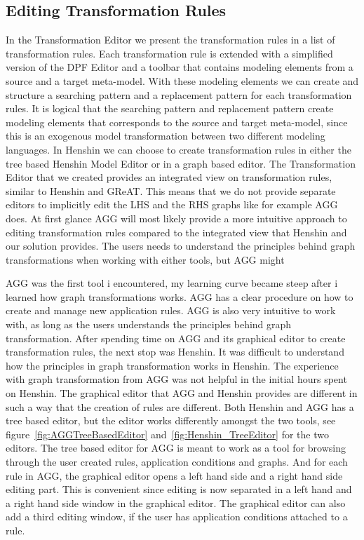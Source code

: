 \subsection{Editing Transformation Rules}

In the Transformation Editor we present the transformation rules in a list of
transformation rules. Each transformation rule is extended with a simplified
version of the DPF Editor and a toolbar that contains modeling elements from a
source and a target meta-model. With these modeling elements we can create and
structure a searching pattern and a replacement pattern for each transformation
rules. It is logical that the searching pattern and replacement pattern create
modeling elements that corresponds to the source and target meta-model, since
this is an exogenous model transformation between two different modeling
languages. In Henshin we can choose to create transformation rules in either the
tree based Henshin Model Editor or in a graph based editor. The Transformation
Editor that we created provides an integrated view on transformation rules,
similar to Henshin and GReAT\cite{GReAT}. This means that we do not provide
separate editors to implicitly edit the LHS and the RHS graphs like for
example AGG does. At first glance AGG will most likely provide a more intuitive
approach to editing transformation rules compared to the integrated view that
Henshin and our solution provides. The users needs to understand the principles
behind graph transformations when working with either tools, but AGG might 


AGG was the first tool i encountered, my learning curve became steep after i
learned how graph transformations works. AGG has a clear procedure on how to create and
manage new application rules. AGG is also very intuitive to work with, as long
as the users understands the principles behind graph transformation.
After spending time on AGG and its graphical editor to create transformation rules, the next
stop was Henshin. It was difficult to understand how the principles in graph
transformation works in Henshin. The experience with graph transformation from
AGG was not helpful in the initial hours spent on Henshin. The graphical editor
that AGG and Henshin provides are different in such a way that the creation of
rules are different. Both Henshin and AGG has a tree based editor, but the
editor works differently amongst the two tools, see
figure~\ref{fig:AGGTreeBasedEditor} and~\ref{fig:Henshin_TreeEditor} for the
two editors. The tree based editor for AGG is meant to work as a tool for
browsing through the user created rules, application conditions and graphs. And
for each rule in AGG, the graphical editor opens a left hand side and a right
hand side editing part. This is convenient since editing is now separated in a
left hand and a right hand side window in the graphical editor. The graphical editor can also
add a third editing window, if the user has application conditions attached to a
rule. 


